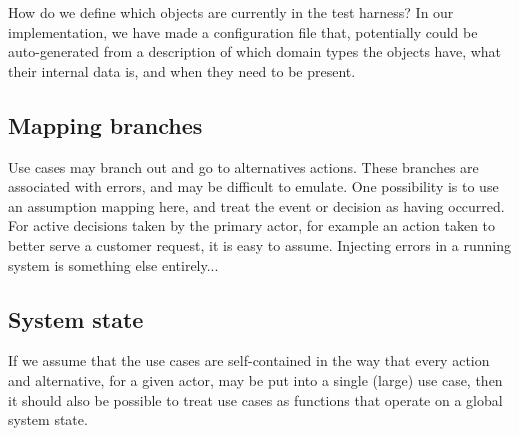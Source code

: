 How do we define which objects are currently in the test harness? In our implementation, we have made a configuration file that, potentially could be auto-generated from a description of which domain types the objects have, what their internal data is, and when they need to be present.

\subsection{Mapping branches}
Use cases may branch out and go to alternatives actions. These branches are associated with errors, and may be difficult to emulate. One possibility is to use an assumption mapping here, and treat the event or decision as having occurred. For active decisions taken by the primary actor, for example an action taken to better serve a customer request, it is easy to assume. Injecting errors in a running system is something else entirely... %

\subsection{System state}
\label{ssec:system-state}
If we assume that the use cases are self-contained\cite{larman2005} in the way that every action and alternative, for a given actor, may be put into a single (large) use case, then it should also be possible to treat use cases as functions that operate on a global system state.\\\\

